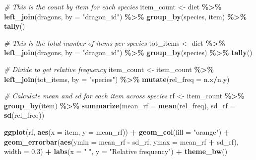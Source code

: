 \documentclass[
]{book}
\newenvironment{Shaded}{\begin{snugshade}}{\end{snugshade}}
\newcommand{\AttributeTok}[1]{\textcolor[rgb]{0.13,0.29,0.53}{#1}}
\newcommand{\CommentTok}[1]{\textcolor[rgb]{0.56,0.35,0.01}{\textit{#1}}}
\newcommand{\FloatTok}[1]{\textcolor[rgb]{0.00,0.00,0.81}{#1}}
\newcommand{\FunctionTok}[1]{\textcolor[rgb]{0.13,0.29,0.53}{\textbf{#1}}}
\newcommand{\NormalTok}[1]{#1}
\newcommand{\OtherTok}[1]{\textcolor[rgb]{0.56,0.35,0.01}{#1}}
\newcommand{\SpecialCharTok}[1]{\textcolor[rgb]{0.81,0.36,0.00}{\textbf{#1}}}
\newcommand{\StringTok}[1]{\textcolor[rgb]{0.31,0.60,0.02}{#1}}
\begin{document}
\begin{Shaded}
\begin{Highlighting}[]
\CommentTok{\# This is the count by item for each species}
\NormalTok{item\_count }\OtherTok{\textless{}{-}}\NormalTok{ diet }\SpecialCharTok{\%\textgreater{}\%} 
  \FunctionTok{left\_join}\NormalTok{(dragons, }\AttributeTok{by =} \StringTok{"dragon\_id"}\NormalTok{) }\SpecialCharTok{\%\textgreater{}\%} 
  \FunctionTok{group\_by}\NormalTok{(species, item) }\SpecialCharTok{\%\textgreater{}\%} 
  \FunctionTok{tally}\NormalTok{()}

\CommentTok{\# This is the total number of items per species}
\NormalTok{tot\_items }\OtherTok{\textless{}{-}}\NormalTok{ diet }\SpecialCharTok{\%\textgreater{}\%} 
  \FunctionTok{left\_join}\NormalTok{(dragons, }\AttributeTok{by =} \StringTok{"dragon\_id"}\NormalTok{) }\SpecialCharTok{\%\textgreater{}\%} 
  \FunctionTok{group\_by}\NormalTok{(species) }\SpecialCharTok{\%\textgreater{}\%} 
  \FunctionTok{tally}\NormalTok{()}

\CommentTok{\# Divide to get relative frequency}
\NormalTok{item\_count }\OtherTok{\textless{}{-}}\NormalTok{ item\_count }\SpecialCharTok{\%\textgreater{}\%} 
  \FunctionTok{left\_join}\NormalTok{(tot\_items, }\AttributeTok{by =} \StringTok{"species"}\NormalTok{) }\SpecialCharTok{\%\textgreater{}\%} 
  \FunctionTok{mutate}\NormalTok{(}\AttributeTok{rel\_freq =}\NormalTok{ n.x}\SpecialCharTok{/}\NormalTok{n.y)}

\CommentTok{\# Calculate mean and sd for each item across species}
\NormalTok{rf }\OtherTok{\textless{}{-}}\NormalTok{ item\_count }\SpecialCharTok{\%\textgreater{}\%} 
  \FunctionTok{group\_by}\NormalTok{(item) }\SpecialCharTok{\%\textgreater{}\%} 
  \FunctionTok{summarize}\NormalTok{(}\AttributeTok{mean\_rf =} \FunctionTok{mean}\NormalTok{(rel\_freq), }\AttributeTok{sd\_rf =} \FunctionTok{sd}\NormalTok{(rel\_freq))}

\FunctionTok{ggplot}\NormalTok{(rf, }\FunctionTok{aes}\NormalTok{(}\AttributeTok{x =}\NormalTok{ item, }\AttributeTok{y =}\NormalTok{ mean\_rf)) }\SpecialCharTok{+}
  \FunctionTok{geom\_col}\NormalTok{(}\AttributeTok{fill =} \StringTok{"orange"}\NormalTok{) }\SpecialCharTok{+} 
  \FunctionTok{geom\_errorbar}\NormalTok{(}\FunctionTok{aes}\NormalTok{(}\AttributeTok{ymin =}\NormalTok{ mean\_rf }\SpecialCharTok{{-}}\NormalTok{ sd\_rf,}
                    \AttributeTok{ymax =}\NormalTok{ mean\_rf }\SpecialCharTok{+}\NormalTok{ sd\_rf),}
                \AttributeTok{width =} \FloatTok{0.3}\NormalTok{) }\SpecialCharTok{+}
  \FunctionTok{labs}\NormalTok{(}\AttributeTok{x =} \StringTok{" "}\NormalTok{, }\AttributeTok{y =} \StringTok{"Relative frequency"}\NormalTok{) }\SpecialCharTok{+}
  \FunctionTok{theme\_bw}\NormalTok{()}
\end{Highlighting}
\end{Shaded}
\end{document}
